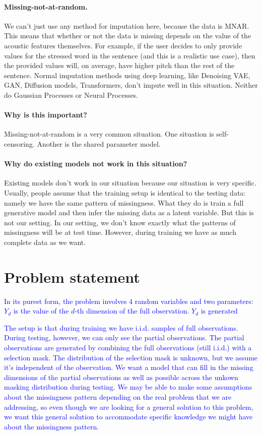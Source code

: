 \documentclass[a4paper,12pt,twoside,openright]{article}
\newcommand{\draft}[1]{\textcolor{blue}{#1}}
\begin{document}
   \paragraph{Missing-not-at-random.} We can't just use any method for imputation here, because the data is MNAR. This means that whether or not the data is missing depends on the value of the acoustic features themselves. For example, if the user decides to only provide values for the stressed word in the sentence (and this is a realistic use case), then the provided values will, on average, have higher pitch than the rest of the sentence. Normal imputation methods using deep learning, like Denoising VAE, GAN, Diffusion models, Transformers, don't impute well in this situation. Neither do Gaussian Processes or Neural Processes.

\paragraph{Why is this important?} Missing-not-at-random is a very common situation. One situation is self-censoring. Another is the shared parameter model.

\paragraph{Why do existing models not work in this situation?} Existing models don't work in our situation because our situation is very specific. Usually, people assume that the training setup is identical to the testing data: namely we have the same pattern of missingness. What they do is train a full generative model and then infer the missing data as a latent variable. But this is not our setting. In our setting, we don't know exactly what the patterns of missingness will be at test time. However, during training we have as much complete data as we want. 

\section{Problem statement}

\draft{In its purest form, the problem involves 4 random variables and two parameters: $Y_d$ is the value of the $d$-th dimension of the full observation. $Y_d$ is generated }

\draft{The setup is that during training we have i.i.d. samples of full observations. During testing, however, we can only see the partial observations. The partial observations are generated by combining the full observations (still i.i.d.) with a selection mask. The distribution of the selection mask is unknown, but we assume it's independent of the observation. We want a model that can fill in the missing dimensions of the partial observations as well as possible across the unkown masking distribution during testing. We may be able to make some assumptions about the missingness pattern depending on the real problem that we are addressing, so even though we are looking for a general solution to this problem, we want this general solution to accommodate specific knowledge we might have about the missingness pattern.}
\end{document}
